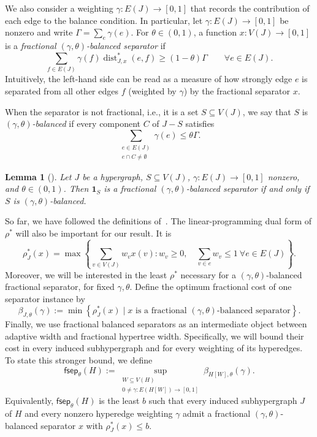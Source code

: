 \documentclass[11pt,letterpaper]{article}
\newtheorem{lemma}[lemma]{Lemma}
\theoremstyle{definition}
\theoremstyle{remark}
\newcommand{\fsep}{\mathsf{fsep}}
\begin{document}
We also consider a weighting $\gamma:E(J)\to[0,1]$ that records the contribution of each edge to the balance condition.
In particular, let $\gamma:E(J)\to[0,1]$ be nonzero and write
$\Gamma=\sum_e\gamma(e)$.  For $\theta\in(0,1)$, a function
$x:V(J)\to[0,1]$ is a \emph{fractional $(\gamma,\theta)$-balanced separator}
if
\begin{equation}
 \sum_{f\in E(J)}
 \gamma(f)\operatorname{dist}_{J,x}^*(e,f)
 \ge (1-\theta)\Gamma
 \qquad\forall e\in E(J).
 \label{eq:fractional-balance}
\end{equation}
Intuitively, the left-hand side can be read as a measure of how strongly edge $e$ is separated from all other edges $f$ (weighted by $\gamma$) by the fractional separator $x$.


When the separator is not fractional, i.e., it is a set $S\subseteq V(J)$, we say that $S$ is \emph{$(\gamma,\theta)$-balanced} if
every component $C$ of $J-S$ satisfies
\begin{equation}
 \sum_{\substack{e\in E(J)\\e\cap C\ne\emptyset}}\gamma(e)
 \le \theta\Gamma.
 \label{eq:integral-balance}
\end{equation}

\begin{lemma}[{\cite[Fact~5.4]{KorchemnaEtAl2024}}]
\label{lem:indicator-equivalence}
Let $J$ be a hypergraph, $S\subseteq V(J)$,
$\gamma:E(J)\to[0,1]$ nonzero, and $\theta\in(0,1)$.
Then $\mathbf 1_S$ is a fractional
$(\gamma,\theta)$-balanced separator if and only if $S$ is $(\gamma,\theta)$-balanced.
\end{lemma}



So far, we have followed the definitions of~\cite{KorchemnaEtAl2024}. The linear-programming dual form of $\rho^*$ will also be important for our result. It is
\begin{equation}
 \rho_J^*(x)
 =\max\left\{
  \sum_{v\in V(J)}w_vx(v):
  w_v\ge0,\quad
  \sum_{v\in e}w_v\le1\ \forall e\in E(J)
 \right\}.
 \label{eq:cover-dual}
\end{equation}
Moreover, we will be interested in the least $\rho^*$ necessary for a $(\gamma,\theta)$-balanced fractional separator, for fixed $\gamma,\theta$. Define the optimum fractional cost of one separator instance by
\[
 \beta_{J,\theta}(\gamma)
 :=
 \min\left\{
  \rho_J^*(x) \mid
  x\text{ is a fractional }(\gamma,\theta)\text{-balanced separator}
 \right\}.
\]
Finally, we use fractional balanced separators as an intermediate object between
adaptive width and fractional hypertree width. Specifically, we will bound their cost in every induced subhypergraph and for every weighting of its hyperedges.  To state this stronger bound, we define
\[
 \fsep_\theta(H)
 :=
 \sup_{\substack{W\subseteq V(H)\\
                  0\ne\gamma:E(H[W])\to[0,1]}}
 \beta_{H[W],\theta}(\gamma).
\]
Equivalently, $\fsep_\theta(H)$ is the least $b$ such that every induced
subhypergraph $J$ of $H$ and every nonzero hyperedge weighting $\gamma$
admit a fractional $(\gamma,\theta)$-balanced separator $x$ with
$\rho_J^*(x)\le b$.
\end{document}

